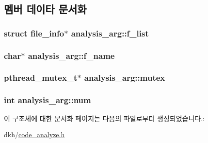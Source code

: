 \subsection{멤버 데이타 문서화}
\hypertarget{structanalysis__arg_a06dce9c50b6212f9fd620d149adc5734}{
\subsubsection[{f\+\_\+list}]{\setlength{\rightskip}{0pt plus 5cm}struct {\bf file\+\_\+info}$\ast$ analysis\+\_\+arg\+::f\+\_\+list}}\label{structanalysis__arg_a06dce9c50b6212f9fd620d149adc5734}
\hypertarget{structanalysis__arg_ae4dc80fc7340c819c3315324b1c24511}{
\subsubsection[{f\+\_\+name}]{\setlength{\rightskip}{0pt plus 5cm}char$\ast$ analysis\+\_\+arg\+::f\+\_\+name}}\label{structanalysis__arg_ae4dc80fc7340c819c3315324b1c24511}
\hypertarget{structanalysis__arg_a5af66e583b346de25aee6ab4acaa91a7}{
\subsubsection[{mutex}]{\setlength{\rightskip}{0pt plus 5cm}pthread\+\_\+mutex\+\_\+t$\ast$ analysis\+\_\+arg\+::mutex}}\label{structanalysis__arg_a5af66e583b346de25aee6ab4acaa91a7}
\hypertarget{structanalysis__arg_af120d208cb66f64281db9ccd6f2f6afc}{
\subsubsection[{num}]{\setlength{\rightskip}{0pt plus 5cm}int analysis\+\_\+arg\+::num}}\label{structanalysis__arg_af120d208cb66f64281db9ccd6f2f6afc}


이 구조체에 대한 문서화 페이지는 다음의 파일로부터 생성되었습니다.\+:\begin{DoxyCompactItemize}
\item 
dkh/\hyperlink{code__analyze_8h}{code\+\_\+analyze.\+h}\end{DoxyCompactItemize}
